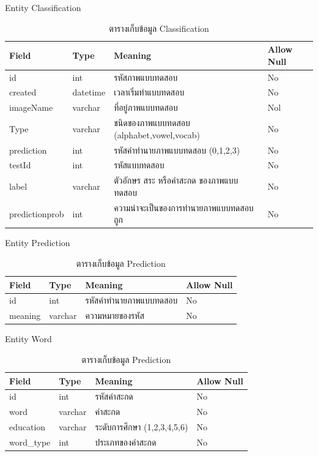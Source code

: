 \documentclass[12pt,oneside,openright,a4paper]{cpe-thai-project}
\begin{document}
      Entity Classification
      \begin{table}[!h]\centering
        \caption{ตารางเก็บข้อมูล Classification}\label{tbl:application1}
        \begin{tabular}{|p{2cm}|p{2cm}|p{7cm}|p{2cm}|} \hline
          Field & Type & Meaning & Allow Null \\ \hline
          id & int & รหัสภาพแบบทดสอบ & No \\ \hline
          created & datetime & เวลาเริ่มทำแบบทดสอบ &No \\ \hline
          imageName & varchar & ที่อยู่ภาพแบบทดสอบ & Nol \\ \hline
          Type & varchar & ชนิดของภาพแบบทดสอบ (alphabet,vowel,vocab) & No \\ \hline
          prediction & int & รหัสคำทำนายภาพแบบทดสอบ (0,1,2,3) & No \\ \hline
          testId & int & รหัสแบบทดสอบ & No \\ \hline
          label & varchar & ตัวอักษร สระ หรือคำสะกด ของภาพแบบทดสอบ & No \\ \hline
          predictionprob & int & ความน่าจะเป็นของการทำนายภาพแบบทดสอบถูก & No \\ \hline
        \end{tabular}
        \end{table}

        \newpage
        Entity Prediction
        \begin{table}[!h]\centering
          \caption{ตารางเก็บข้อมูล Prediction}\label{tbl:application1}
          \begin{tabular}{|p{2cm}|p{2cm}|p{7cm}|p{2cm}|} \hline
            Field & Type & Meaning & Allow Null \\ \hline
            id & int & รหัสคำทำนายภาพแบบทดสอบ & No \\ \hline
            meaning & varchar & ความหมายของรหัส &No \\ \hline
           
          \end{tabular}
          \end{table}

          
        Entity Word 
        \begin{table}[!h]\centering
          \caption{ตารางเก็บข้อมูล Prediction}\label{tbl:application1}
          \begin{tabular}{|p{2cm}|p{2cm}|p{7cm}|p{2cm}|} \hline
            Field & Type & Meaning & Allow Null \\ \hline
            id & int & รหัสคำสะกด & No \\ \hline
            word & varchar & คำสะกด &No \\ \hline
            education & varchar & ระดับการศึกษา (1,2,3,4,5,6) & No \\ \hline
            word_type & int & ประเภทของคำสะกด &No \\ \hline
          \end{tabular}
          \end{table}
\newpage
\end{document}

